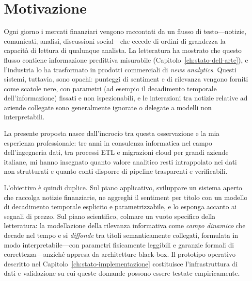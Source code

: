 \chapter{Motivazione}
\label{ch:motivazione}

Ogni giorno i mercati finanziari vengono raccontati da un flusso di testo---notizie, comunicati, analisi, discussioni social---che eccede di ordini di grandezza la capacità di lettura di qualunque analista.
La letteratura ha mostrato che questo flusso contiene informazione predittiva misurabile (Capitolo~\ref{ch:stato-dell-arte}), e l'industria lo ha trasformato in prodotti commerciali di \textit{news analytics}.
Questi sistemi, tuttavia, sono opachi: punteggi di sentiment e di rilevanza vengono forniti come scatole nere, con parametri (ad esempio il decadimento temporale dell'informazione) fissati e non ispezionabili, e le interazioni tra notizie relative ad aziende collegate sono generalmente ignorate o delegate a modelli non interpretabili.

La presente proposta nasce dall'incrocio tra questa osservazione e la mia esperienza professionale: tre anni in consulenza informatica nel campo dell'ingegneria dati, tra processi ETL e migrazioni cloud per grandi aziende italiane, mi hanno insegnato quanto valore analitico resti intrappolato nei dati non strutturati e quanto conti disporre di pipeline trasparenti e verificabili.

L'obiettivo è quindi duplice.
Sul piano applicativo, sviluppare un sistema aperto che raccolga notizie finanziarie, ne aggreghi il sentiment per titolo con un modello di decadimento temporale esplicito e parametrizzabile, e lo esponga accanto ai segnali di prezzo.
Sul piano scientifico, colmare un vuoto specifico della letteratura: la modellazione della rilevanza informativa come \emph{campo dinamico} che decade nel tempo e si \emph{diffonde} tra titoli semanticamente collegati, formulata in modo interpretabile---con parametri fisicamente leggibili e garanzie formali di correttezza---anziché appresa da architetture black-box.
Il prototipo operativo descritto nel Capitolo~\ref{ch:stato-implementazione} costituisce l'infrastruttura di dati e validazione su cui queste domande possono essere testate empiricamente.

